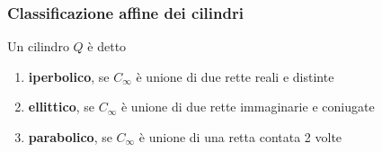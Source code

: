 \documentclass{report}
\begin{document}

\subsubsection{Classificazione affine dei cilindri}
Un cilindro \(Q\) è detto 
\begin{enumerate}
    \item \textbf{iperbolico}, se \(C_\infty\) è unione di due rette reali e distinte
    \item \textbf{ellittico}, se \(C_\infty\) è unione di due rette immaginarie e coniugate
    \item \textbf{parabolico}, se \(C_\infty\) è unione di una retta contata 2 volte
\end{enumerate}
\end{document}
